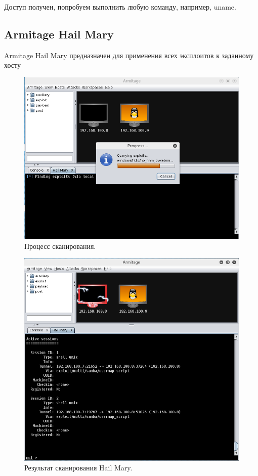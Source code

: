 \documentclass[10pt,a4paper]{report}
\begin{document}
Доступ получен, попробуем выполнить любую команду, например, uname.

\subsection{Armitage Hail Mary}
Armitage Hail Mary предназначен для применения всех эксплоитов к заданному хосту

\begin{figure}[h!]
	\centering
	\includegraphics[width=\textwidth]{Img/11}
	\caption{Процесс сканирования.}
\end{figure}

\begin{figure}[h!]
	\centering
	\includegraphics[width=\textwidth]{Img/12}
	\caption{Результат сканирования Hail Mary.}
\end{figure}
\end{document}
